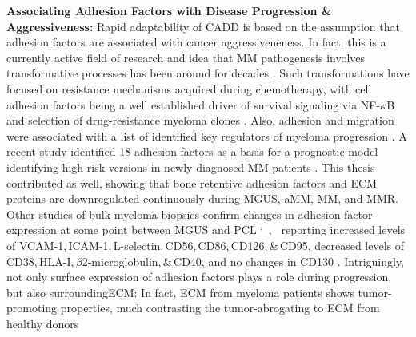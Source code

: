 \textbf{Associating Adhesion Factors with Disease Progression \& Aggressiveness:}
Rapid adaptability of \ac{CADD} is based on the assumption that adhesion factors
are associated with cancer aggressiveneness. In fact, this is a currently active field
of research and idea that MM pathogenesis involves transformative processes has
been around for decades \cite{hallekMultipleMyelomaIncreasing1998}. Such
transformations have focused on resistance mechanisms acquired during
chemotherapy, with cell adhesion factors being a well established driver of
survival signaling via NF-$\kappa$B and selection of drug-resistance myeloma
clones \cite{landowskiCellAdhesionmediatedDrug2003,
solimandoDrugResistanceMultiple2022}. Also, adhesion and migration were
associated with a list of identified key regulators of myeloma
progression
\cite{shenProgressionSignatureUnderlies2021}. A recent study identified 18
adhesion factors as a basis for a prognostic model identifying high-risk
versions in newly diagnosed MM patients
\cite{huDevelopmentCellAdhesionbased2024}. This thesis contributed as well,
showing that bone retentive adhesion factors and \ac{ECM} proteins are
downregulated continuously during \ac{MGUS}, \ac{aMM}, \ac{MM}, and \ac{MMR}.
Other studies of bulk myeloma biopsies confirm changes in adhesion factor
expression at some point between \ac{MGUS} and \ac{PCL}%
%
$^,$\,%
,~%
reporting %
increased levels of VCAM-1,\,ICAM-1,\,L-selectin,\,CD56,\,CD86,\,CD126,\,\&\,CD95, %
decreased levels of CD38,\,HLA-I,\,$\beta$2-microglobulin,\,\&\,CD40, and %
no changes in CD130 %
\cite{terposIncreasedCirculatingVCAM12016, perez-andresClonalPlasmaCells2005}.
Intriguingly, not only surface expression of adhesion factors plays a role
during progression, but also surrounding\ac{ECM}: In fact, \ac{ECM} from myeloma
patients shows tumor-promoting properties, much contrasting the tumor-abrogating
to \ac{ECM} from healthy donors
\cite{ibraheemBMMSCsderivedECMModifies2019}

